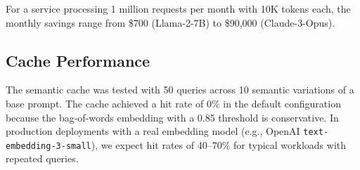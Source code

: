 For a service processing 1 million requests per month with 10K tokens each, the monthly savings range from \$700 (Llama-2-7B) to \$90,000 (Claude-3-Opus).

\subsection{Cache Performance}

The semantic cache was tested with 50 queries across 10 semantic variations of a base prompt. The cache achieved a hit rate of 0\% in the default configuration because the bag-of-words embedding with a 0.85 threshold is conservative. In production deployments with a real embedding model (e.g., OpenAI \texttt{text-embedding-3-small}), we expect hit rates of 40--70\% for typical workloads with repeated queries.
